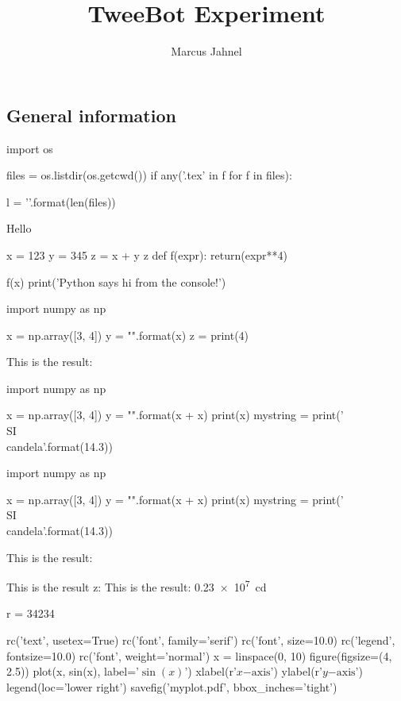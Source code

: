 \documentclass[a4paper, landscape, 10pt, onesided, twocolumn]{scrreprt}
\title{TweeBot Experiment}
\author{Marcus Jahnel}
\def\dtHeadline#1{
    \ifcase#1
        \or \section*{Overview of Dual-Trap Transcription Experiment} 
        \or \section*{Overview of Dual-Trap DNA Stetching Experiment} 
        \or \section*{Overview of Dual-Trap Fluorescence Experiment} 
        \or \section*{Overview of Dual-Trap Membrane Experiment} 
        \or \section*{Overview of Dual-Trap Calibration Experiment} 
        \or \section*{Overview of Dual-Trap Optics Experiment} 
        \or \section*{Overview of Another Dual-Trap Experiment} 
    \fi
}
\begin{document}
\subsection*{General information}

\begin{pycode}
import os

files = os.listdir(os.getcwd())
if any('.tex' in f for f in files):
     
l = '{}'.format(len(files))

\end{pycode}

Hello 
\begin{pyconsole}[][frame=single]
x = 123
y = 345
z = x + y
z
def f(expr):
    return(expr**4)

f(x)
print('Python says hi from the console!')
\end{pyconsole}

\begin{pycode}
import numpy as np

x = np.array([3, 4])
y = "{}".format(x)
z = print(4)
\end{pycode}

This is the result: 

\begin{pycode}
import numpy as np

x = np.array([3, 4])
y = "{}".format(x + x)
print(x)
mystring = print('\\SI{{{}}}{{\\candela}}'.format(14.3))
\end{pycode}

\begin{pyblock}
import numpy as np

x = np.array([3, 4])
y = "{}".format(x + x)
print(x)
mystring = print('\\SI{{{}}}{{\\candela}}'.format(14.3))
\end{pyblock}

This is the result: 


This is the result z: 
This is the result: 
\SI{.23e7}{\candela}
\begin{sympyblock}
r = 34234
\end{sympyblock}

\begin{pylabcode}
rc('text', usetex=True)
rc('font', family='serif')
rc('font', size=10.0)
rc('legend', fontsize=10.0)
rc('font', weight='normal')
x = linspace(0, 10)
figure(figsize=(4, 2.5))
plot(x, sin(x), label='$\sin(x)$')
xlabel(r'$x\mathrm{-axis}$')
ylabel(r'$y\mathrm{-axis}$')
legend(loc='lower right')
savefig('myplot.pdf', bbox_inches='tight')
\end{pylabcode}
\end{document}
